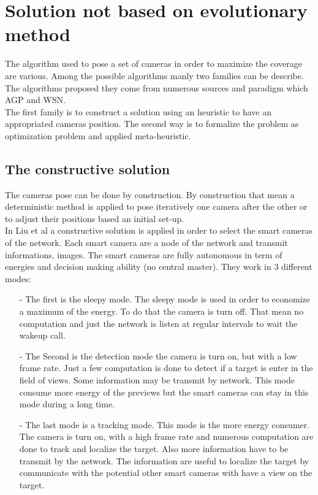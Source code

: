 	\section{Solution not based on evolutionary method}
	
The algorithm used to pose a set of cameras in order to maximize the coverage are various.  Among the possible algorithms manly two families can be describe. The algorithms proposed they come from numerous sources and paradigm  which AGP and WSN.\\
 The first family is to construct a solution using an heuristic to have an appropriated cameras position. The second way is to formalize the problem as optimization problem and applied meta-heuristic. 

\subsection{The constructive solution}

The cameras pose can be done by construction. By construction that mean a deterministic method is applied to pose iteratively one camera after the other  or to adjust their positions based an initial set-up.\\
In Liu et al \cite{38*liu2010} a constructive solution is applied in order to select the smart cameras of the network. Each smart camera are a node of the network and transmit informations, images. The smart cameras are fully autonomous in term of energies and decision making ability (no central master). 
They work in 3 different modes:
\begin{itemize}
\item[-] The first is the sleepy mode. The sleepy mode is used in order to economize a maximum of the energy. To do that the camera is turn off. That mean no computation and just the network is listen at regular intervals to wait the wakeup call.   \\

\item[-] The Second is the detection mode the camera is turn on, but with a low frame rate. Just a few computation is done to detect if a target is enter in the field of views. Some information may be transmit by network. This mode consume more energy of the previews but the smart cameras can stay in this mode during a long time.\\

\item[-] The last mode is a tracking mode. This mode is the more energy consumer. The camera is turn on, with a high frame rate and numerous computation are done to track and localize the target. Also more information have to be transmit by the network. The information are useful to localize the target by communicate with the potential other smart cameras with have a view on the target. 
\end{itemize}


